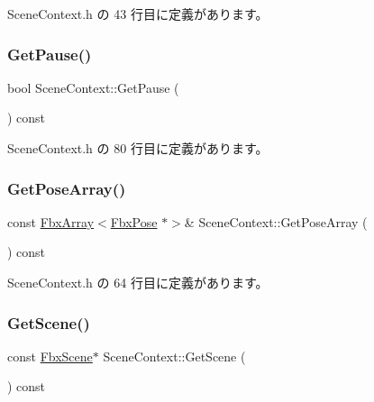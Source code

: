  Scene\+Context.\+h の 43 行目に定義があります。

\mbox{\label{class_scene_context_a4c0e12192d34a63047e3ed044565bfab}} 
\subsubsection{\texorpdfstring{Get\+Pause()}{GetPause()}}
{\footnotesize\ttfamily bool Scene\+Context\+::\+Get\+Pause (\begin{DoxyParamCaption}{ }\end{DoxyParamCaption}) const\hspace{0.3cm}{\ttfamily [inline]}}



 Scene\+Context.\+h の 80 行目に定義があります。

\mbox{\label{class_scene_context_a963c3d4a2d7956bc15ee3dead095fef3}} 
\subsubsection{\texorpdfstring{Get\+Pose\+Array()}{GetPoseArray()}}
{\footnotesize\ttfamily const \hyperlink{class_fbx_array}{Fbx\+Array}$<$\hyperlink{class_fbx_pose}{Fbx\+Pose} $\ast$$>$\& Scene\+Context\+::\+Get\+Pose\+Array (\begin{DoxyParamCaption}{ }\end{DoxyParamCaption}) const\hspace{0.3cm}{\ttfamily [inline]}}



 Scene\+Context.\+h の 64 行目に定義があります。

\mbox{\label{class_scene_context_acdfe66cd9b8838bda8d266769fcad915}} 
\subsubsection{\texorpdfstring{Get\+Scene()}{GetScene()}}
{\footnotesize\ttfamily const \hyperlink{class_fbx_scene}{Fbx\+Scene}$\ast$ Scene\+Context\+::\+Get\+Scene (\begin{DoxyParamCaption}{ }\end{DoxyParamCaption}) const\hspace{0.3cm}{\ttfamily [inline]}}



